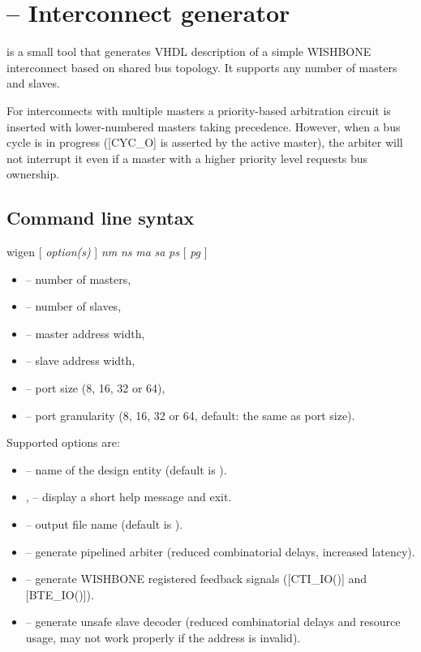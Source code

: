 \documentclass[a4paper,12pt,twoside,extrafontsizes]{memoir}
\begin{document}
\section{ -- Interconnect generator}

 is a small tool that generates VHDL description of a simple WISHBONE interconnect based on shared bus topology. It supports any number of masters and slaves.

For interconnects with multiple masters a priority-based arbitration circuit is inserted with lower-numbered masters taking precedence. However, when a bus cycle is in progress ([CYC\_O] is asserted by the active master), the arbiter will not interrupt it even if a master with a higher priority level requests bus ownership.

\subsection{Command line syntax}

\begin{codepar}
	wigen [ \emph{option(s)} ] \emph{nm} \emph{ns} \emph{ma} \emph{sa} \emph{ps} [ \emph{pg} ]
\end{codepar}

\begin{itemize}
	\item{} -- number of masters,
	\item{} -- number of slaves,
	\item{} -- master address width,
	\item{} -- slave address width,
	\item{} -- port size (8, 16, 32 or 64),
	\item{} -- port granularity (8, 16, 32 or 64, default: the same as port size).
\end{itemize}

Supported options are:

\begin{itemize}
	\item {} -- name of the design entity (default is ).
	
	\item {},  -- display a short help message and exit.
	
	\item {} -- output file name (default is ).
	
	\item {} -- generate pipelined arbiter (reduced combinatorial delays, increased latency).
	
	\item {} -- generate WISHBONE registered feedback signals ([CTI\_IO()] and [BTE\_IO()]).
	
	\item {} -- generate unsafe slave decoder (reduced combinatorial delays and resource usage, may not work properly if the address is invalid).
\end{itemize}
\end{document}
